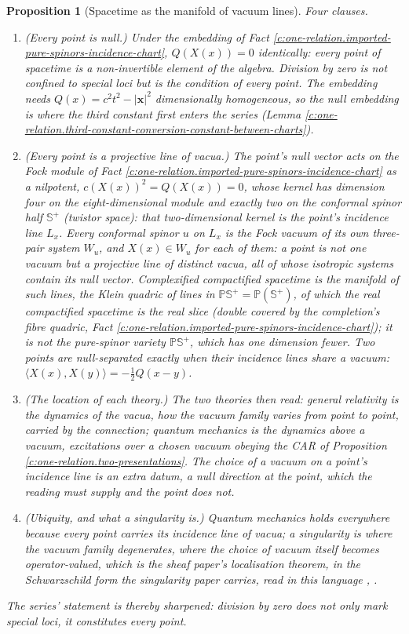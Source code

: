 \documentclass[11pt]{article}
\newtheorem{proposition}[theorem]{Proposition}
\theoremstyle{definition}
\theoremstyle{plain}
\newcommand{\changedmark}[2]{\marginpar{\raggedright\scriptsize\color{#1}#2}}
\providecommand{\CS}{}\renewcommand{\CS}{{\mathbb{S}^{+}}}
\providecommand{\PCS}{}\renewcommand{\PCS}{\mathbb{P}{\mathbb{S}^{+}}}
\providecommand{\ip}{}\renewcommand{\ip}[2]{\langle #1, #2\rangle}
\begin{document}
\begin{proposition}[Spacetime as the manifold of vacuum lines]\label{c:one-relation.spacetime-manifold-vacuum-lines}
\changedmark{gray}{reworded}
Four clauses.
\begin{enumerate}
\item \emph{(Every point is null.)} Under the embedding of Fact \ref{c:one-relation.imported-pure-spinors-incidence-chart}, $Q(X(x)) = 0$ identically: every point of spacetime is a non-invertible element of the algebra. Division by zero is not confined to special loci but is the condition of every point. The embedding needs $Q(x) = c^{2}t^{2} - |\mathbf{x}|^{2}$ dimensionally homogeneous, so the null embedding is where the third constant first enters the series (Lemma \ref{c:one-relation.third-constant-conversion-constant-between-charts}).
\item \emph{(Every point is a projective line of vacua.)} The point's null vector acts on the Fock module of Fact \ref{c:one-relation.imported-pure-spinors-incidence-chart} as a nilpotent, $c(X(x))^{2} = Q(X(x)) = 0$, whose kernel has dimension four on the eight-dimensional module and exactly two on the conformal spinor half $\CS$ (twistor space): that two-dimensional kernel is the point's incidence line $L_{x}$. Every conformal spinor $u$ on $L_{x}$ is the Fock vacuum of its own three-pair system $W_{u}$, and $X(x) \in W_{u}$ for each of them: a point is not one vacuum but a projective line of distinct vacua, all of whose isotropic systems contain its null vector. Complexified compactified spacetime is the manifold of such lines, the Klein quadric of lines in $\PCS = \mathbb{P}(\CS)$, of which the real compactified spacetime is the real slice (double covered by the completion's fibre quadric, Fact \ref{c:one-relation.imported-pure-spinors-incidence-chart}); it is not the pure-spinor variety $\PCS$, which has one dimension fewer. Two points are null-separated exactly when their incidence lines share a vacuum: $\ip{X(x)}{X(y)} = -\tfrac12 Q(x - y)$.
\item \emph{(The location of each theory.)} The two theories then read: general relativity is the dynamics \emph{of} the vacua, how the vacuum family varies from point to point, carried by the connection; quantum mechanics is the dynamics \emph{above} a vacuum, excitations over a chosen vacuum obeying the CAR of Proposition \ref{c:one-relation.two-presentations}. The choice of a vacuum on a point's incidence line is an extra datum, a null direction at the point, which the reading must supply and the point does not.
\item \emph{(Ubiquity, and what a singularity is.)} Quantum mechanics holds everywhere because every point carries its incidence line of vacua; a singularity is where the vacuum family degenerates, where the choice of vacuum itself becomes operator-valued, which is the sheaf paper's localisation theorem, in the Schwarzschild form the singularity paper carries, read in this language \cite[Thm.~4.4, Cor.~4.5, Thm.~8.12]{ButlerT4}, \cite[App.~B]{ButlerT5}.
\end{enumerate}
The series' statement is thereby sharpened: division by zero does not only mark special loci, it constitutes every point.
\end{proposition}
\end{document}
